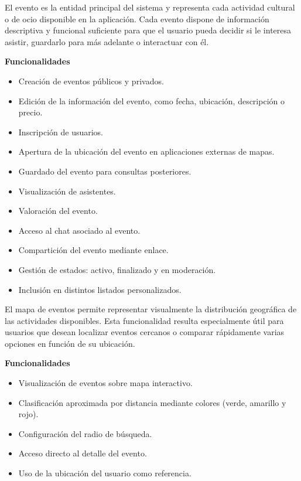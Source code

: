 \begin{tcolorbox}[title=\textbf{Evento}]
El evento es la entidad principal del sistema y representa cada actividad cultural o de ocio disponible en la aplicación. Cada evento dispone de información descriptiva y funcional suficiente para que el usuario pueda decidir si le interesa asistir, guardarlo para más adelante o interactuar con él.

\vspace{0.4em}
\textbf{Funcionalidades}
\begin{itemize}[leftmargin=1.5em]
\item Creación de eventos públicos y privados.
\item Edición de la información del evento, como fecha, ubicación, descripción o precio.
\item Inscripción de usuarios.
\item Apertura de la ubicación del evento en aplicaciones externas de mapas.
\item Guardado del evento para consultas posteriores.
\item Visualización de asistentes.
\item Valoración del evento.
\item Acceso al chat asociado al evento.
\item Compartición del evento mediante enlace.
\item Gestión de estados: activo, finalizado y en moderación.
\item Inclusión en distintos listados personalizados.
\end{itemize}
\end{tcolorbox}

\begin{tcolorbox}[title=\textbf{Mapa de eventos}]
El mapa de eventos permite representar visualmente la distribución geográfica de las actividades disponibles. Esta funcionalidad resulta especialmente útil para usuarios que desean localizar eventos cercanos o comparar rápidamente varias opciones en función de su ubicación.

\vspace{0.4em}
\textbf{Funcionalidades}
\begin{itemize}[leftmargin=1.5em]
\item Visualización de eventos sobre mapa interactivo.
\item Clasificación aproximada por distancia mediante colores (verde, amarillo y rojo).
\item Configuración del radio de búsqueda.
\item Acceso directo al detalle del evento.
\item Uso de la ubicación del usuario como referencia.
\end{itemize}
\end{tcolorbox}

